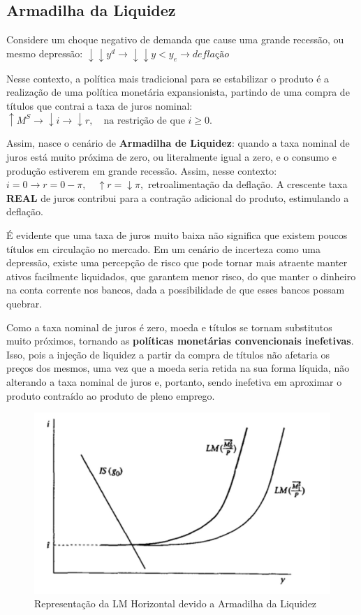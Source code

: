 \documentclass[a4paper,12pt]{article}[abntex2]
\begin{document}
\subsection{\textbf{Armadilha da Liquidez}}
Considere um choque negativo de demanda que cause uma grande recessão, ou mesmo depressão:
\( \downarrow\downarrow y^d \to \downarrow\downarrow y < y_e \to \textit{deflação} \)

Nesse contexto, a política mais tradicional para se estabilizar o produto é a realização de uma política monetária expansionista, partindo de uma compra de títulos que contrai a taxa de juros nominal:
\( \uparrow M^S \to \downarrow i \to \downarrow r, \quad \text{na restrição de que } i \geq 0. \)

Assim, nasce o cenário de \textbf{Armadilha de Liquidez}: quando a taxa nominal de juros está muito próxima de zero, ou literalmente igual a zero, e o consumo e produção estiverem em grande recessão. Assim, nesse contexto:
\( i = 0 \to r = 0 - \pi, \quad \uparrow r = \downarrow \pi, \)
retroalimentação da deflação. A crescente taxa \textbf{REAL} de juros contribui para a contração adicional do produto, estimulando a deflação.

É evidente que uma taxa de juros muito baixa não significa que existem poucos títulos em circulação no mercado. Em um cenário de incerteza como uma depressão, existe uma percepção de risco que pode tornar mais atraente manter ativos facilmente liquidados, que garantem menor risco, do que manter o dinheiro na conta corrente nos bancos, dada a possibilidade de que esses bancos possam quebrar.

Como a taxa nominal de juros é zero, moeda e títulos se tornam substitutos muito próximos, tornando as \textbf{políticas monetárias convencionais inefetivas}. Isso, pois a injeção de liquidez a partir da compra de títulos não afetaria os preços dos mesmos, uma vez que a moeda seria retida na sua forma líquida, não alterando a taxa nominal de juros e, portanto, sendo inefetiva em aproximar o produto contraído ao produto de pleno emprego.

\begin{figure}[H]
    \centering
    \caption{Representação da LM Horizontal devido a Armadilha da Liquidez}
    \includegraphics[width=0.7\linewidth]{Imagens/a4i5.png}
\end{figure}
\end{document}
